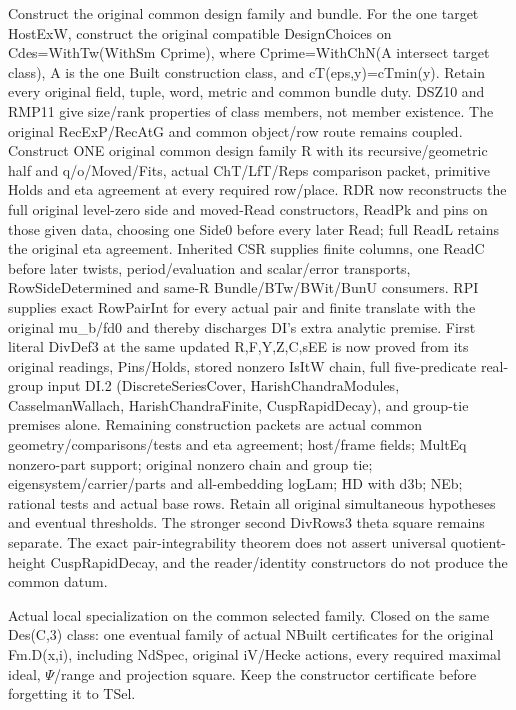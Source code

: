 \begin{description}[style=nextline]
\item[28. DESIGN\_CHOICES\_COMMON --- C] Construct the original common design family and bundle. For the one target HostExW, construct the original compatible DesignChoices on Cdes=WithTw(WithSm Cprime), where Cprime=WithChN(A intersect target class), A is the one Built construction class, and cT(eps,y)=cTmin(y). Retain every original field, tuple, word, metric and common bundle duty. DSZ10 and RMP11 give size/\allowbreak{}rank properties of class members, not member existence. The original RecExP/\allowbreak{}RecAtG and common object/\allowbreak{}row route remains coupled. Construct ONE original common design family R with its recursive/\allowbreak{}geometric half and q/\allowbreak{}o/\allowbreak{}Moved/\allowbreak{}Fits, actual ChT/\allowbreak{}LfT/\allowbreak{}Reps comparison packet, primitive Holds and eta agreement at every required row/\allowbreak{}place. RDR now reconstructs the full original level-zero side and moved-Read constructors, ReadPk and pins on those given data, choosing one Side0 before every later Read; full ReadL retains the original eta agreement. Inherited CSR supplies finite columns, one ReadC before later twists, period/\allowbreak{}evaluation and scalar/\allowbreak{}error transports, RowSideDetermined and same-R Bundle/\allowbreak{}BTw/\allowbreak{}BWit/\allowbreak{}BunU consumers. RPI supplies exact RowPairInt for every actual pair and finite translate with the original mu\_b/\allowbreak{}fd0 and thereby discharges DI's extra analytic premise. First literal DivDef3 at the same updated R,F,Y,Z,C,sEE is now proved from its original readings, Pins/\allowbreak{}Holds, stored nonzero IsItW chain, full five-predicate real-group input DI.2 (DiscreteSeriesCover, HarishChandraModules, CasselmanWallach, HarishChandraFinite, CuspRapidDecay), and group-tie premises alone. Remaining construction packets are actual common geometry/\allowbreak{}comparisons/\allowbreak{}tests and eta agreement; host/\allowbreak{}frame fields; MultEq nonzero-part support; original nonzero chain and group tie; eigensystem/\allowbreak{}carrier/\allowbreak{}parts and all-embedding logLam; HD with d3b; NEb; rational tests and actual base rows. Retain all original simultaneous hypotheses and eventual thresholds. The stronger second DivRows3 theta square remains separate. The exact pair-integrability theorem does not assert universal quotient-height CuspRapidDecay, and the reader/\allowbreak{}identity constructors do not produce the common datum.

\item[29. LOCAL\_NBUILT\_COMMON --- C] Actual local specialization on the common selected family. Closed on the same Des(C,3) class: one eventual family of actual NBuilt certificates for the original Fm.D(x,i), including NdSpec, original iV/\allowbreak{}Hecke actions, every required maximal ideal, $\Psi$/\allowbreak{}range and projection square. Keep the constructor certificate before forgetting it to TSel.


\end{description}
